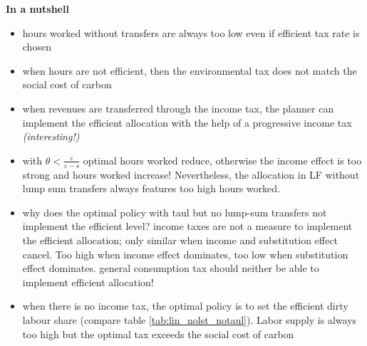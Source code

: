 \textbf{In a nutshell}
\begin{itemize}
	\item hours worked without transfers are always too low even if efficient tax rate is chosen
	\item when hours are not efficient, then the environmental tax does not match the social cost of carbon
	\item when revenues are transferred through the income tax, the planner can implement the efficient allocation with the help of a progressive income tax \textit{(interesting!)}
	\item with $\theta<\frac{\varepsilon}{\varepsilon-s}$ optimal hours worked reduce, otherwise the income effect is too strong and hours worked increase! 
	Nevertheless, the allocation in LF without lump sum transfers always features too high hours worked. 
	\item why does the optimal policy with taul but no lump-sum transfers not implement the efficient level? \ar income taxes are not a measure to implement the efficient allocation; only similar when income and substitution effect cancel. Too high when income effect dominates, too low when substitution effect dominates.
 \ar general consumption tax should neither be able to implement efficient allocation! 
 \item when there is no income tax, the optimal policy is to set the efficient dirty labour share (compare table \ref{tab:lin_nolst_notaul}). Labor supply is always too high but the optimal tax exceeds the social cost of carbon
\end{itemize}

